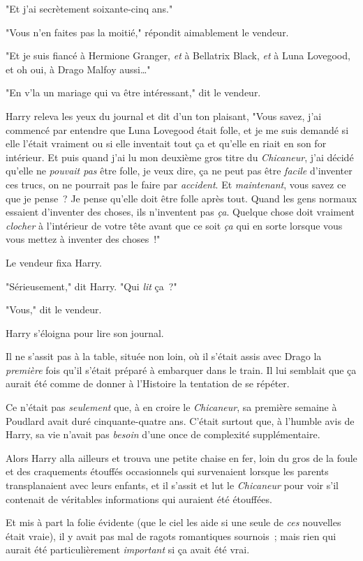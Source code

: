 "Et j'ai secrètement soixante-cinq ans."

"Vous n'en faites pas la moitié," répondit aimablement le vendeur.

"Et je suis fiancé à Hermione Granger, \emph{et} à Bellatrix Black, \emph{et} à Luna Lovegood, et oh oui, à Drago Malfoy aussi…"

"En v'la un mariage qui va être intéressant," dit le vendeur.

Harry releva les yeux du journal et dit d'un ton plaisant, "Vous savez, j'ai commencé par entendre que Luna Lovegood était folle, et je me suis demandé si elle l'était vraiment ou si elle inventait tout ça et qu'elle en riait en son for intérieur. Et puis quand j'ai lu mon deuxième gros titre du \emph{Chicaneur}, j'ai décidé qu'elle ne \emph{pouvait pas} être folle, je veux dire, ça ne peut pas être \emph{facile} d'inventer ces trucs, on ne pourrait pas le faire par \emph{accident}. Et \emph{maintenant}, vous savez ce que je pense~? Je pense qu'elle doit être folle après tout. Quand les gens normaux essaient d'inventer des choses, ils n'inventent pas \emph{ça}. Quelque chose doit vraiment \emph{clocher} à l'intérieur de votre tête avant que ce soit \emph{ça} qui en sorte lorsque vous vous mettez à inventer des choses~!"

Le vendeur fixa Harry.

"Sérieusement," dit Harry. "Qui \emph{lit} ça~?"

"Vous," dit le vendeur.

Harry s'éloigna pour lire son journal.

Il ne s'assit pas à la table, située non loin, où il s'était assis avec Drago la \emph{première} fois qu'il s'était préparé à embarquer dans le train. Il lui semblait que ça aurait été comme de donner à l'Histoire la tentation de se répéter.

Ce n'était pas \emph{seulement} que, à en croire le \emph{Chicaneur}, sa première semaine à Poudlard avait duré cinquante-quatre ans. C'était surtout que, à l'humble avis de Harry, sa vie n'avait pas \emph{besoin} d'une once de complexité supplémentaire.

Alors Harry alla ailleurs et trouva une petite chaise en fer, loin du gros de la foule et des craquements étouffés occasionnels qui survenaient lorsque les parents transplanaient avec leurs enfants, et il s'assit et lut le \emph{Chicaneur} pour voir s'il contenait de véritables informations qui auraient été étouffées.

Et mis à part la folie évidente (que le ciel les aide si une seule de \emph{ces} nouvelles était vraie), il y avait pas mal de ragots romantiques sournois~; mais rien qui aurait été particulièrement \emph{important} si ça avait été vrai.

